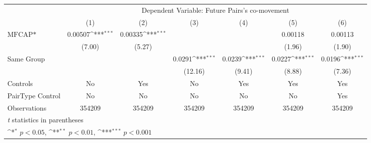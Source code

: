 {
\def\sym#1{\ifmmode^{#1}\else\(^{#1}\)\fi}
\begin{tabular}{l*{6}{c}}
\hline\hline
                &\multicolumn{6}{c}{Dependent Variable:  Future Pairs's co-movement}                                              \\\cmidrule(lr){2-7}
                &\multicolumn{1}{c}{(1)}         &\multicolumn{1}{c}{(2)}         &\multicolumn{1}{c}{(3)}         &\multicolumn{1}{c}{(4)}         &\multicolumn{1}{c}{(5)}         &\multicolumn{1}{c}{(6)}         \\
\hline
$ \text{MFCAP*} $&  0.00507\sym{***}&  0.00335\sym{***}&                  &                  &  0.00118         &  0.00113         \\
                &   (7.00)         &   (5.27)         &                  &                  &   (1.96)         &   (1.90)         \\
[1em]
Same Group      &                  &                  &   0.0291\sym{***}&   0.0239\sym{***}&   0.0227\sym{***}&   0.0196\sym{***}\\
                &                  &                  &  (12.16)         &   (9.41)         &   (8.88)         &   (7.36)         \\
\hline
Controls        &       No         &      Yes         &       No         &      Yes         &      Yes         &      Yes         \\
PairType Control&       No         &       No         &       No         &       No         &       No         &      Yes         \\
Observations    &   354209         &   354209         &   354209         &   354209         &   354209         &   354209         \\
\hline\hline
\multicolumn{7}{l}{\footnotesize \textit{t} statistics in parentheses}\\
\multicolumn{7}{l}{\footnotesize \sym{*} \(p<0.05\), \sym{**} \(p<0.01\), \sym{***} \(p<0.001\)}\\
\end{tabular}
}
